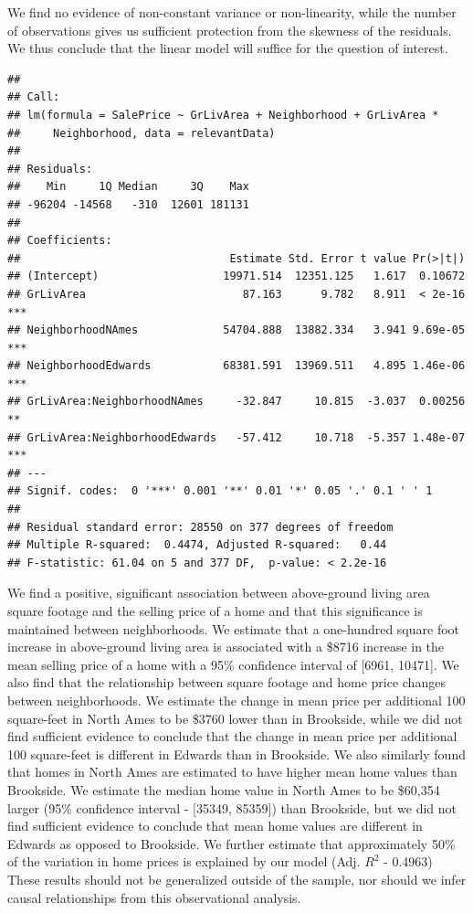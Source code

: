\documentclass[american,]{article}
\begin{document}
We find no evidence of non-constant variance or non-linearity, while the
number of observations gives us sufficient protection from the skewness
of the residuals. We thus conclude that the linear model will suffice
for the question of interest.

\begin{verbatim}
## 
## Call:
## lm(formula = SalePrice ~ GrLivArea + Neighborhood + GrLivArea * 
##     Neighborhood, data = relevantData)
## 
## Residuals:
##    Min     1Q Median     3Q    Max 
## -96204 -14568   -310  12601 181131 
## 
## Coefficients:
##                                Estimate Std. Error t value Pr(>|t|)    
## (Intercept)                   19971.514  12351.125   1.617  0.10672    
## GrLivArea                        87.163      9.782   8.911  < 2e-16 ***
## NeighborhoodNAmes             54704.888  13882.334   3.941 9.69e-05 ***
## NeighborhoodEdwards           68381.591  13969.511   4.895 1.46e-06 ***
## GrLivArea:NeighborhoodNAmes     -32.847     10.815  -3.037  0.00256 ** 
## GrLivArea:NeighborhoodEdwards   -57.412     10.718  -5.357 1.48e-07 ***
## ---
## Signif. codes:  0 '***' 0.001 '**' 0.01 '*' 0.05 '.' 0.1 ' ' 1
## 
## Residual standard error: 28550 on 377 degrees of freedom
## Multiple R-squared:  0.4474, Adjusted R-squared:   0.44 
## F-statistic: 61.04 on 5 and 377 DF,  p-value: < 2.2e-16
\end{verbatim}

We find a positive, significant association between above-ground living
area square footage and the selling price of a home and that this
significance is maintained between neighborhoods. We estimate that a
one-hundred square foot increase in above-ground living area is
associated with a \$8716 increase in the mean selling price of a home
with a 95\% confidence interval of {[}6961, 10471{]}. We also find that
the relationship between square footage and home price changes between
neighborhoods. We estimate the change in mean price per additional 100
square-feet in North Ames to be \$3760 lower than in Brookside, while we
did not find sufficient evidence to conclude that the change in mean
price per additional 100 square-feet is different in Edwards than in
Brookside. We also similarly found that homes in North Ames are
estimated to have higher mean home values than Brookside. We estimate
the median home value in North Ames to be \$60,354 larger (95\%
confidence interval - {[}35349, 85359{]}) than Brookside, but we did not
find sufficient evidence to conclude that mean home values are different
in Edwards as opposed to Brookside. We further estimate that
approximately 50\% of the variation in home prices is explained by our
model (Adj. \(R^2\) - 0.4963) These results should not be generalized
outside of the sample, nor should we infer causal relationships from
this observational analysis.
\end{document}
